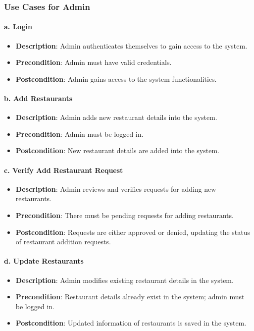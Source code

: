 \documentclass[12pt, a4paper, oneside]{article}
\begin{document}
\subsubsection{Use Cases for Admin}

\paragraph{a. Login}
\begin{itemize}
    \item \textbf{Description}: Admin authenticates themselves to gain access to the system.
    \item \textbf{Precondition}: Admin must have valid credentials.
    \item \textbf{Postcondition}: Admin gains access to the system functionalities.
\end{itemize}

\paragraph{b. Add Restaurants}
\begin{itemize}
    \item \textbf{Description}: Admin adds new restaurant details into the system.
    \item \textbf{Precondition}: Admin must be logged in.
    \item \textbf{Postcondition}: New restaurant details are added into the system.
\end{itemize}

\paragraph{c. Verify Add Restaurant Request}
\begin{itemize}
    \item \textbf{Description}: Admin reviews and verifies requests for adding new restaurants.
    \item \textbf{Precondition}: There must be pending requests for adding restaurants.
    \item \textbf{Postcondition}: Requests are either approved or denied, updating the status of restaurant addition requests.
\end{itemize}

\paragraph{d. Update Restaurants}
\begin{itemize}
    \item \textbf{Description}: Admin modifies existing restaurant details in the system.
    \item \textbf{Precondition}: Restaurant details already exist in the system; admin must be logged in.
    \item \textbf{Postcondition}: Updated information of restaurants is saved in the system.
\end{itemize}
\end{document}
